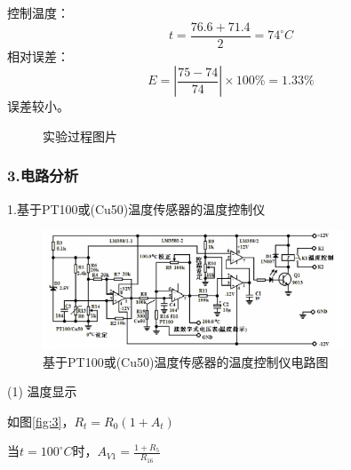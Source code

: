 \documentclass[12pt,a4paper,UTF8]{ctexart}
\begin{document}
控制温度：
\begin{equation*}
	t= \frac{76.6+71.4}{2}  = 74^{\circ}C
\end{equation*}
相对误差：
\begin{equation*}
	E=\left\lvert \frac{75-74}{74}\right\rvert \times 100\%=1.33\%
\end{equation*}
误差较小。
\begin{figure}[!h]
	\centering
	\caption{实验过程图片}
	\label{fig:tcvi}
\end{figure}

\subsubsection*{3.电路分析}
1.基于PT100或(Cu50)温度传感器的温度控制仪

\begin{figure}[!h]
	\centering
	\includegraphics[width=0.8\textwidth]{img//1.jpg}
	\caption{基于PT100或(Cu50)温度传感器的温度控制仪电路图}
\end{figure}

(1) 温度显示

如图\ref*{fig:3}，$R_t=R_0(1+A_t)$

当$t=100^{\circ}C$时，$A_{V1}=\frac{1+R_5}{R_16}$
\end{document}
